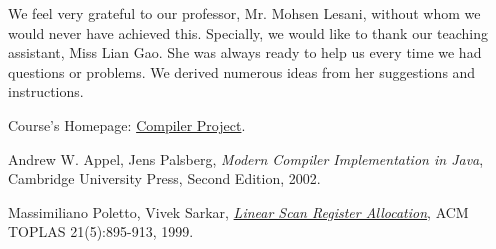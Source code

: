 \documentclass[letterpaper, 14pt]{article}
\begin{document}
We feel very grateful to our professor, Mr. Mohsen Lesani, without whom we would never have achieved this. Specially, we would like to thank our teaching assistant, Miss Lian Gao. She was always ready to help us every time we had questions or problems. We derived numerous ideas from her suggestions and instructions. 

\begin{thebibliography}{9}

	Course's Homepage: 
	\href{https://www.cs.ucr.edu/~lesani/teaching/cp/cp.html}{Compiler Project}. 

	Andrew W. Appel, Jens Palsberg, 
	\textit{Modern Compiler Implementation in Java},
	Cambridge University Press, 
	Second Edition, 
	2002. 

	Massimiliano Poletto, Vivek Sarkar, 
	\href{http://web.cs.ucla.edu/~palsberg/course/cs132/linearscan.pdf}{\textit{Linear Scan Register Allocation}}, 
	ACM TOPLAS 21(5):895-913, 
	1999.

\end{thebibliography}
\end{document}
